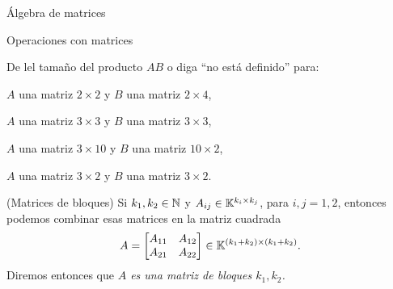 \begin{chapter}{\'Algebra de matrices}
\begin{section}{Operaciones con matrices}
\begin{enumex}
            \item De lel tamaño del producto $AB$ o diga ``no está definido'' para:
            \begin{enumex}
                \item $A$ una matriz $2 \times 2$ y $B$ una matriz $2 \times 4$,
                \item $A$ una matriz $3 \times 3$ y $B$ una matriz $3 \times 3$,
                \item $A$ una matriz $3 \times 10$ y $B$ una matriz $10 \times 2$,
                \item $A$ una matriz $3 \times 2$ y $B$ una matriz $3 \times 2$.
            \end{enumex}

            \item\label{matriz-de-bloques} (Matrices  de bloques)  Si $k_1, k_2 \in \mathbb N$ y $A_{ij} \in \mathbb K^{k_i \times k_j}$, para $i,j=1,2$, entonces podemos combinar esas matrices en la matriz cuadrada
            $$
            A = \begin{bmatrix} A_{11}&A_{12}\\A_{21}&A_{22}  \end{bmatrix} \in \mathbb K^{(k_1 + k_2) \times (k_1 + k_2)}. 
            $$ 
            Diremos entonces que \textit{$A$ es una matriz de bloques  $k_1,k_2$.}
            

\end{enumex}
\end{section}
\end{chapter}
